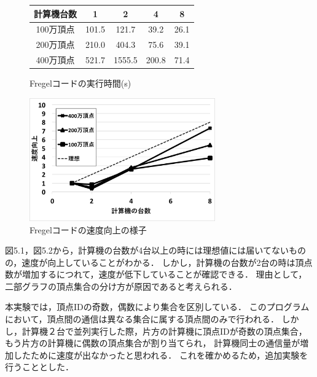 \documentclass[12pt]{ujreport}
\begin{document}
\begin{figure}[ht]
  \begin{minipage}{0.45\textwidth}
    \begin{center}
      \makeatletter
      \def\@captype{table}
      \makeatother
      \begin{tabular}{|c||c|c|c|c|}\hline
        計算機台数 & 1 & 2 & 4 & 8\\ \hline
        100万頂点 & 101.5 & 121.7 & 39.2 & 26.1\\ \hline
        200万頂点 & 210.0 & 404.3 & 75.6 & 39.1\\ \hline
        400万頂点 & 521.7 & 1555.5 & 200.8 & 71.4 \\ \hline
      \end{tabular}
      \caption{Fregelコードの実行時間(s)}
    \end{center}
  \end{minipage}
  \begin{minipage}{0.8\textwidth}
    \begin{center}
      \includegraphics[width = 8cm]{kisuuFregel.png}
      \caption{Fregelコードの速度向上の様子}
    \end{center}
  \end{minipage}
\end{figure}

\newpage

図5.1，図5.2から，計算機の台数が4台以上の時には理想値には届いてないものの，速度が向上していることがわかる．
しかし，計算機の台数が2台の時は頂点数が増加するにつれて，速度が低下していることが確認できる．
理由として，二部グラフの頂点集合の分け方が原因であると考えられる．

本実験では，頂点IDの奇数，偶数により集合を区別している．
このプログラムにおいて，頂点間の通信は異なる集合に属する頂点間のみで行われる．
しかし，計算機２台で並列実行した際，片方の計算機に頂点IDが奇数の頂点集合，もう片方の計算機に偶数の頂点集合が割り当てられ，
計算機同士の通信量が増加したために速度が出なかったと思われる．
これを確かめるため，追加実験を行うこととした．
\end{document}
